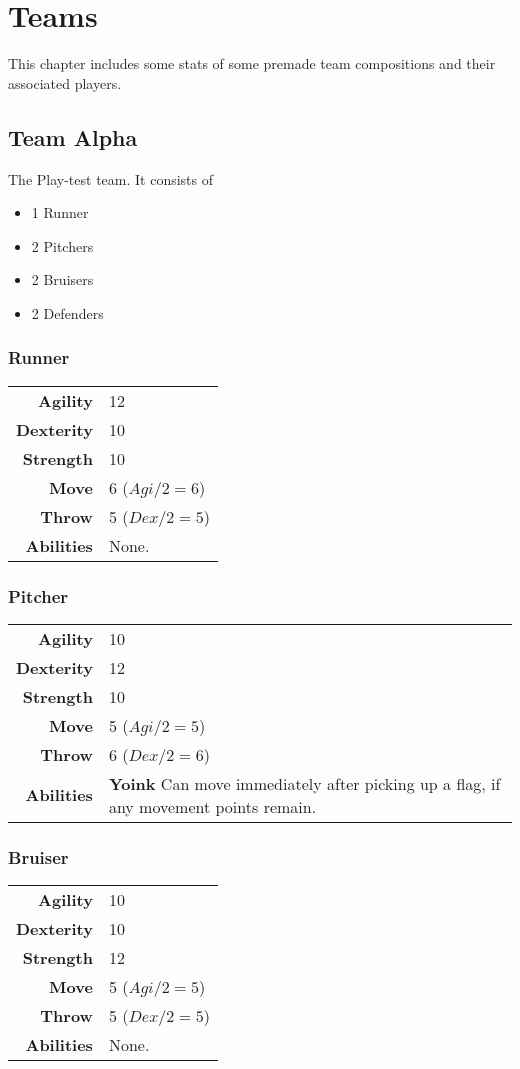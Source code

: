 \chapter{Teams}
This chapter includes some stats of some premade team compositions and their associated players.
\section{Team Alpha}
The Play-test team. It consists of
\begin{itemize}
    \item 1 Runner
    \item 2 Pitchers
    \item 2 Bruisers
    \item 2 Defenders
\end{itemize}

\subsection{Runner}
\begin{tabular}{r|l}
    \textbf{Agility} & 12 \\
    \textbf{Dexterity} & 10 \\
    \textbf{Strength} & 10 \\ \hline
    \textbf{Move} & 6 ($Agi/2=6$)\\
    \textbf{Throw} & 5 ($Dex/2=5$) \\ \hline
    \textbf{Abilities} & None.
\end{tabular}

\subsection{Pitcher}
\begin{tabular}{r|l}
    \textbf{Agility} & 10 \\
    \textbf{Dexterity} & 12 \\
    \textbf{Strength} & 10 \\ \hline
    \textbf{Move} & 5 ($Agi/2=5$)\\
    \textbf{Throw} & 6 ($Dex/2=6$) \\ \hline
    \textbf{Abilities} & \textbf{Yoink} Can move immediately after picking up a flag, if any movement points remain.
\end{tabular}

\subsection{Bruiser}
\begin{tabular}{r|l}
    \textbf{Agility} & 10 \\
    \textbf{Dexterity} & 10 \\
    \textbf{Strength} & 12 \\ \hline
    \textbf{Move} & 5 ($Agi/2=5$)\\
    \textbf{Throw} & 5 ($Dex/2=5$) \\ \hline
    \textbf{Abilities} & None.
\end{tabular}

